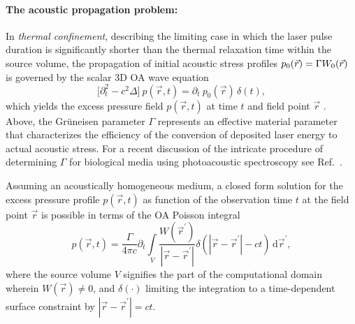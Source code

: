 \documentclass[12pt]{iopart}
\begin{document}
\paragraph{The acoustic propagation problem:}
In \emph{thermal confinement}, describing the limiting case in which the laser
pulse duration is significantly shorter than the thermal relaxation time within
the source volume, the propagation of initial acoustic stress profiles $p_{\rm
0}(\vec{r})=\Gamma W_{\rm 0}(\vec{r})$ is governed by the scalar $3$D OA wave
equation
\begin{equation}
\big[ \partial_t^2 - c^{2} \Delta \big]~p(\vec{r},t) = 
        \partial_t~p_0(\vec{r})\,\delta(t), 
        \label{eq:OAWaveEq}
\end{equation}
which yields the excess pressure field $p(\vec{r},t)$ at time $t$ and field
point $\vec{r}$ \cite{Gusev:1993,Wang:2009}.
Above, the Gr\"uneisen parameter $\Gamma$ represents an effective material 
parameter that characterizes the efficiency of the conversion of deposited
laser energy to actual acoustic stress. For a recent discussion of the 
intricate procedure of determining $\Gamma$ for biological media using
photoacoustic spectroscopy see Ref.\ \cite{Yao:2014b}.

Assuming an acoustically homogeneous medium,
a closed form solution for the excess pressure profile 
$p(\vec{r},t)$ as function of the observation time $t$ at the field
point $\vec{r}$ is possible in terms of the OA Poisson integral
\begin{equation}
p(\vec{r},t) = \frac{\Gamma}{4\pi c} \partial_t
\int\limits_{V}\!\frac{W(\vec{r}^\prime)}{|\vec{r}-\vec{r}^\prime|}
\delta(|\vec{r}-\vec{r}^\prime| - ct)\,\mathrm{d}\vec{r}^\prime
,\label{eq:PAPoissonEq}
\end{equation} 
where the source volume $V$ signifies the part of the computational domain
wherein $W(\vec{r})\neq 0$, and $\delta(\cdot)$ limiting the
integration to a time-dependent surface constraint by $|\vec{r}-\vec{r}^\prime|
= ct$.  
\end{document}
